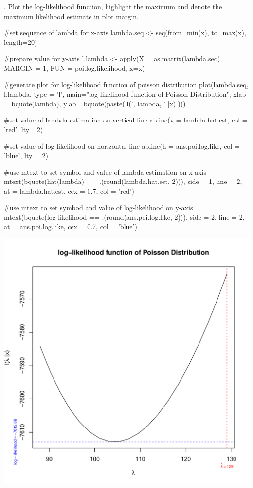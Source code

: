 \documentclass[12pt, oneside]{report}\usepackage[]{graphicx}\usepackage[]{color}
\makeatletter
\def\maxwidth{ %
  \ifdim\Gin@nat@width>\linewidth
    \linewidth
  \else
    \Gin@nat@width
  \fi
}
\makeatother
\begin{document}
. Plot the log-likelihood function, highlight the maximum and denote the maximum likelihood
estimate in plot margin.
\begin{Schunk}
\begin{Sinput}
#set sequence of lambda for x-axis
lambda.seq <- seq(from=min(x), to=max(x), length=20)

#prepare value for y-axis
l.lambda <- apply(X = as.matrix(lambda.seq), MARGIN = 1, FUN = poi.log.likelihood, x=x)

#generate plot for log-likelihood function of poisson distribution
plot(lambda.seq, l.lambda, type = 'l', main="log-likelihood function of Poisson Distribution", xlab = bquote(lambda), ylab =bquote(paste('l(', lambda, ' |x)')))

#set value of lambda estimation on vertical line 
abline(v = lambda.hat.est, col = 'red', lty =2)

#set value of log-likelihood on horizontal line
abline(h = ans.poi.log.like, col = 'blue', lty = 2)

#use mtext to set symbol and value of lambda estimation on x-axis
mtext(bquote(hat(lambda) == .(round(lambda.hat.est, 2))), side = 1, line = 2,
      at = lambda.hat.est, cex = 0.7, col = 'red')

#use mtext to set symbod and value of log-likelihood on y-axis
mtext(bquote(log-likelihood == .(round(ans.poi.log.like, 2))), side = 2, line = 2,
      at = ans.poi.log.like, cex = 0.7, col = 'blue')
\end{Sinput}

\includegraphics[width=\maxwidth]{figure/unnamed-chunk-3-1} \end{Schunk}
\end{document}
